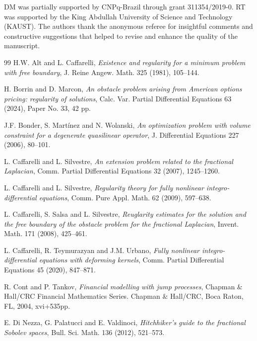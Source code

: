 \documentclass[11pt, reqno]{amsart}
\numberwithin{equation}{section}
\numberwithin{theorem}{section}
\numberwithin{lemma}{section}
\numberwithin{corollary}{section}
\numberwithin{remark}{section}
\numberwithin{proposition}{section}
\numberwithin{definition}{section}
\begin{document}
\vspace{0.25cm}

 DM was partially supported by CNPq-Brazil through grant 311354/2019-0. RT was supported by the King Abdullah University of Science and Technology (KAUST). The authors thank the anonymous referee for insightful comments and constructive suggestions that helped to revise and enhance the quality of the manuscript.

\smallskip

\begin{thebibliography}{99}
 H.W. Alt and L. Caffarelli, \textit{Existence and regularity for a minimum problem with free boundary}, J. Reine Angew. Math. 325 (1981), 105--144.

 H. Borrin and D. Marcon, \textit{An obstacle problem arising from American options pricing: regularity of solutions}, Calc. Var. Partial Differential Equations 63 (2024), Paper No. 33, 42 pp.

 J.F. Bonder, S. Mart\'{i}nez and N. Wolanski, \textit{An optimization problem with volume constraint for a degenerate quasilinear operator}, J. Differential Equations 227 (2006), 80--101.

 L. Caffarelli and L. Silvestre, \textit{An extension problem related to the fractional Laplacian}, Comm. Partial Differential Equations 32 (2007), 1245--1260.

 L. Caffarelli and L. Silvestre, \textit{Regularity theory for fully nonlinear integro-differential equations}, Comm. Pure Appl. Math. 62 (2009), 597--638. 

 L. Caffarelli, S. Salsa and L. Silvestre, \textit{Reuglarity estimates for the solution and the free boundary of the obstacle problem for the fractional Laplacian}, Invent. Math. 171 (2008), 425--461.

 L. Caffarelli, R. Teymurazyan and J.M. Urbano, \textit{Fully nonlinear integro-differential equations with deforming kernels}, Comm. Partial Differential Equations 45 (2020), 847--871.

 R. Cont and P. Tankov, \textit{Financial modelling with jump processes}, Chapman $\&$ Hall/CRC Financial Mathematics Series. Chapman $\&$ Hall/CRC, Boca Raton, FL, 2004, xvi+535pp.

 E. Di Nezza, G. Palatucci and E. Valdinoci, \textit{Hitchhiker's guide to the fractional Sobolev spaces}, Bull. Sci. Math. 136 (2012), 521--573.


\end{thebibliography}
\end{document}
